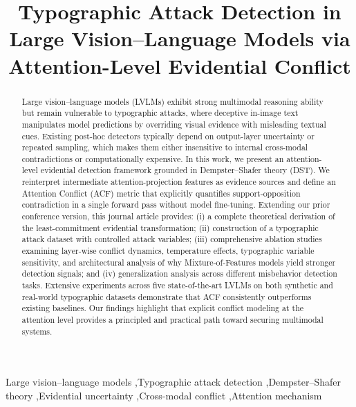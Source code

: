 \documentclass[preprint,12pt]{elsarticle}
\begin{document}
\begin{frontmatter}

\title{Typographic Attack Detection in Large Vision--Language Models via Attention-Level Evidential Conflict}


\begin{abstract}
Large vision--language models (LVLMs) exhibit strong multimodal reasoning ability but remain vulnerable to typographic attacks, where deceptive in-image text manipulates model predictions by overriding visual evidence with misleading textual cues. Existing post-hoc detectors typically depend on output-layer uncertainty or repeated sampling, which makes them either insensitive to internal cross-modal contradictions or computationally expensive. In this work, we present an attention-level evidential detection framework grounded in Dempster--Shafer theory (DST). We reinterpret intermediate attention-projection features as evidence sources and define an Attention Conflict (ACF) metric that explicitly quantifies support-opposition contradiction in a single forward pass without model fine-tuning. Extending our prior conference version, this journal article provides: (i) a complete theoretical derivation of the least-commitment evidential transformation; (ii) construction of a typographic attack dataset with controlled attack variables; (iii) comprehensive ablation studies examining layer-wise conflict dynamics, temperature effects, typographic variable sensitivity, and architectural analysis of why Mixture-of-Features models yield stronger detection signals; and (iv) generalization analysis across different misbehavior detection tasks. Extensive experiments across five state-of-the-art LVLMs on both synthetic and real-world typographic datasets demonstrate that ACF consistently outperforms existing baselines. Our findings highlight that explicit conflict modeling at the attention level provides a principled and practical path toward securing multimodal systems.
\end{abstract}

\begin{keyword}
Large vision--language models \sep Typographic attack detection \sep Dempster--Shafer theory \sep Evidential uncertainty \sep Cross-modal conflict \sep Attention mechanism
\end{keyword}

\end{frontmatter}

\end{document}
